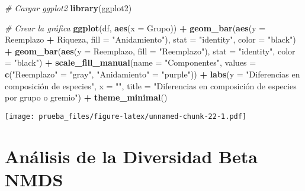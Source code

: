 \documentclass[
]{article}
\newenvironment{Shaded}{\begin{snugshade}}{\end{snugshade}}
\newcommand{\AttributeTok}[1]{\textcolor[rgb]{0.13,0.29,0.53}{#1}}
\newcommand{\CommentTok}[1]{\textcolor[rgb]{0.56,0.35,0.01}{\textit{#1}}}
\newcommand{\FunctionTok}[1]{\textcolor[rgb]{0.13,0.29,0.53}{\textbf{#1}}}
\newcommand{\NormalTok}[1]{#1}
\newcommand{\OtherTok}[1]{\textcolor[rgb]{0.56,0.35,0.01}{#1}}
\newcommand{\SpecialCharTok}[1]{\textcolor[rgb]{0.81,0.36,0.00}{\textbf{#1}}}
\newcommand{\StringTok}[1]{\textcolor[rgb]{0.31,0.60,0.02}{#1}}
\begin{document}
\begin{Shaded}
\begin{Highlighting}[]
\CommentTok{\# Cargar ggplot2}
\FunctionTok{library}\NormalTok{(ggplot2)}

\CommentTok{\# Crear la gráfica}
\FunctionTok{ggplot}\NormalTok{(df, }\FunctionTok{aes}\NormalTok{(}\AttributeTok{x =}\NormalTok{ Grupo)) }\SpecialCharTok{+}
  \FunctionTok{geom\_bar}\NormalTok{(}\FunctionTok{aes}\NormalTok{(}\AttributeTok{y =}\NormalTok{ Reemplazo }\SpecialCharTok{+}\NormalTok{ Riqueza, }\AttributeTok{fill =} \StringTok{"Anidamiento"}\NormalTok{), }\AttributeTok{stat =} \StringTok{"identity"}\NormalTok{, }\AttributeTok{color =} \StringTok{"black"}\NormalTok{) }\SpecialCharTok{+}
  \FunctionTok{geom\_bar}\NormalTok{(}\FunctionTok{aes}\NormalTok{(}\AttributeTok{y =}\NormalTok{ Reemplazo, }\AttributeTok{fill =} \StringTok{"Reemplazo"}\NormalTok{), }\AttributeTok{stat =} \StringTok{"identity"}\NormalTok{, }\AttributeTok{color =} \StringTok{"black"}\NormalTok{) }\SpecialCharTok{+}
  \FunctionTok{scale\_fill\_manual}\NormalTok{(}\AttributeTok{name =} \StringTok{"Componentes"}\NormalTok{, }\AttributeTok{values =} \FunctionTok{c}\NormalTok{(}\StringTok{"Reemplazo"} \OtherTok{=} \StringTok{"gray"}\NormalTok{, }\StringTok{"Anidamiento"} \OtherTok{=} \StringTok{"purple"}\NormalTok{)) }\SpecialCharTok{+}
  \FunctionTok{labs}\NormalTok{(}\AttributeTok{y =} \StringTok{"Diferencias en composición de especies"}\NormalTok{, }\AttributeTok{x =} \StringTok{""}\NormalTok{, }
       \AttributeTok{title =} \StringTok{"Diferencias en composición de especies por grupo o gremio"}\NormalTok{) }\SpecialCharTok{+}
  \FunctionTok{theme\_minimal}\NormalTok{()}
\end{Highlighting}
\end{Shaded}

\texttt{[image: prueba\_files/figure-latex/unnamed-chunk-22-1.pdf]}

\hypertarget{anuxe1lisis-de-la-diversidad-beta-nmds}{%
\section{Análisis de la Diversidad Beta
NMDS}\label{anuxe1lisis-de-la-diversidad-beta-nmds}}
\end{document}
